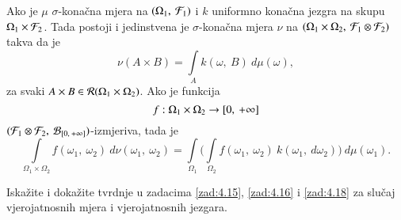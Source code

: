 \begin{zad} \label{zad:4.18}
    Ako je $\mu$ $\sigma$-kona\v cna mjera na $({\Omega_1}, \: {\mathcal{F}_1})$ i $k$ uniformno kona\v cna jezgra na skupu $\Omega_1 \times \mathcal{F}_2$.
    Tada postoji i jedinstvena je $\sigma$-kona\v cna mjera $\nu$ na $({\Omega_1 \times \Omega_2}, \: {\mathcal{F}_1 \otimes \mathcal{F}_2})$ takva da je
    \begin{equation*}
        \nu (A \times B) = \int\limits_A k(\omega, \: B) \: d \mu (\omega),
    \end{equation*}
    za svaki $A \times B \in \mathcal{R}({\Omega_1 \times \Omega_2})$.
    Ako je funkcija
    \begin{equation*}
        f:\Omega_1 \times \Omega_2 \to [{0}, \:{+\infty}]
    \end{equation*}
    $({\mathcal{F}_1 \otimes \mathcal{F}_2}, \: {\mathcal{B}_{[{0}, \:{+\infty}]}})$-izmjeriva, tada je
    \begin{equation*}
        \int\limits_{\Omega_1 \times \Omega_2} f(\omega_1, \: \omega_2) \: d \nu (\omega_1, \: \omega_2) = \int\limits_{\Omega_1} \Big( \int\limits_{\Omega_2} f(\omega_1, \: \omega_2) \: k(\omega_1, \: d \omega_2) \Big) \: d \mu (\omega_1).
    \end{equation*}
\end{zad}

\begin{zad} \label{zad:4.19}
    Iska\v zite i doka\v zite tvrdnje u zadacima \ref{zad:4.15}, \ref{zad:4.16} i \ref{zad:4.18} za slu\v caj vjerojatnosnih mjera i vjerojatnosnih jezgara.
\end{zad}

